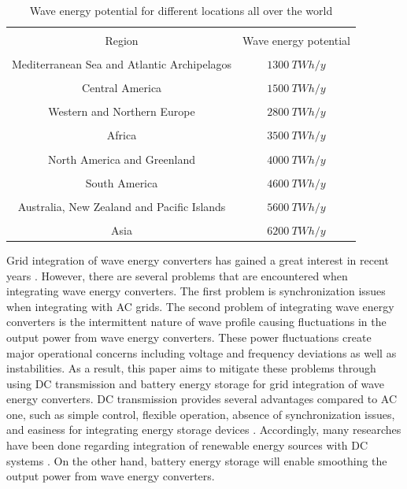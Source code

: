 \documentclass[conference]{IEEEtran}
\begin{document}
\begin{table}[htbp]
	\caption{Wave energy potential for different locations all over the world \cite{3}}
	\begin{center}
		\begin{tabular}{|c|c|}
		 \hline
		 \hline
		 \\[-1em]
		 Region&	Wave energy potential \\
		 \hline
		 \hline
		 \\[-1em]
		 Mediterranean Sea and Atlantic Archipelagos&	$1300\ TWh/y$\\
		 \hline
		 \\[-1em]
		 Central America&	$1500\ TWh/y$ \\
		 \hline
		 \\[-1em]
		 Western and Northern Europe& 	$2800\ TWh/y$ \\
		 \hline
		 \\[-1em]
		 Africa&	$3500\ TWh/y$ \\
		 \hline
		 \\[-1em]
		 North America and Greenland& 	$4000\ TWh/y$ \\
		 \hline
		 \\[-1em]
		 South America&	$4600\ TWh/y$ \\
		 \hline
		 \\[-1em]
		 Australia, New Zealand and Pacific Islands& 	$5600\ TWh/y$\\
		 \hline
		 \\[-1em]
		 Asia& 	$6200\ TWh/y$\\
		 \hline
		 \hline
		\end{tabular}
		\label{tabintro}
	\end{center}
\end{table}

Grid integration of wave energy converters has gained a great interest in recent years \cite{4}. However, there are several problems that are encountered when integrating wave energy converters. The first problem is synchronization issues when integrating with AC grids. The second problem of integrating wave energy converters is the intermittent nature of wave profile causing fluctuations in the output power from wave energy converters. These power fluctuations create major operational concerns including voltage and frequency deviations as well as instabilities. As a result, this paper aims to mitigate these problems through using DC transmission and battery energy storage for grid integration of wave energy converters. DC transmission provides several advantages compared to AC one, such as simple control, flexible operation, absence of synchronization issues, and easiness for integrating energy storage devices \cite{5}. Accordingly, many researches have been done regarding integration of renewable energy sources with DC systems \cite{6,7}. On the other hand, battery energy storage will enable smoothing the output power from wave energy converters.
\end{document}
